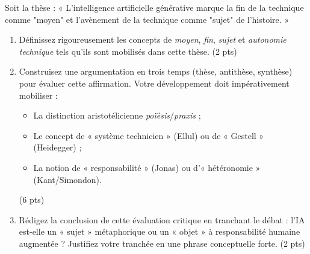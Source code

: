 \documentclass[11pt]{article}
\begin{document}
\begin{exercice}
Soit la thèse : « L'intelligence artificielle générative marque la fin de la technique comme "moyen" et l'avènement de la technique comme "sujet" de l'histoire. »
\begin{enumerate}
    \item Définissez rigoureusement les concepts de \textit{moyen}, \textit{fin}, \textit{sujet} et \textit{autonomie technique} tels qu'ils sont mobilisés dans cette thèse. (2 pts)
    \item Construisez une argumentation en trois temps (thèse, antithèse, synthèse) pour évaluer cette affirmation. Votre développement doit impérativement mobiliser : 
    \begin{itemize}
        \item La distinction aristotélicienne \textit{poïèsis}/\textit{praxis} ;
        \item Le concept de « système technicien » (Ellul) ou de « Gestell » (Heidegger) ;
        \item La notion de « responsabilité » (Jonas) ou d'« hétéronomie » (Kant/Simondon).
    \end{itemize}
    (6 pts)
    \item Rédigez la conclusion de cette évaluation critique en tranchant le débat : l'IA est-elle un « sujet » métaphorique ou un « objet » à responsabilité humaine augmentée ? Justifiez votre tranchée en une phrase conceptuelle forte. (2 pts)
\end{enumerate}
\end{exercice}
\end{document}
